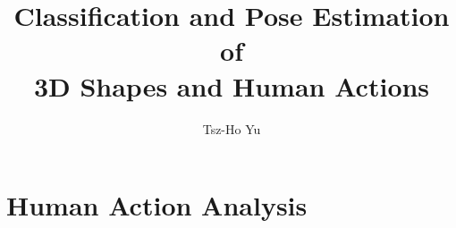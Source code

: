 \documentclass[a4paper, 12pt]{class/thyuthesis}
\title{Classification and Pose Estimation of \\3D Shapes and Human Actions}
\author{Tsz-Ho Yu}
\begin{document}

\frontmatter
{}

%
%



\mainmatter

%



% 
%


\part{Human Action Analysis}


% 
%
%
%

% 

\backmatter
%


\renewcommand{\bibname}{References} 
 
\end{document}
